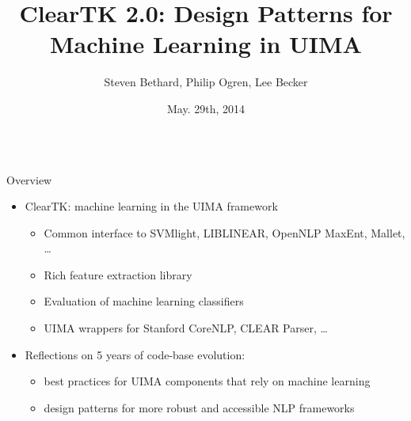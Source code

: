 \documentclass[final]{beamer}
\title{\Huge ClearTK 2.0: Design Patterns for Machine Learning in UIMA\\[0.2ex]}
\author{Steven Bethard\inst{1}, Philip Ogren\inst{2}, Lee Becker\inst{2}}
\institute[] %
{
  \inst{1}%
  University of Alabama at Birmingham, Birmingham, AL, USA
  \\
  \inst{2}%
  University of Colorado Boulder, Boulder, CO, USA
}
\date[May. 29th, 2014]{May. 29th, 2014}
\begin{document}
\begin{frame}[fragile]

\vspace{-1cm}
\begin{columns}[t]
  \begin{column}{.45\linewidth}
    \begin{block}{Overview}
      \begin{itemize}
      \item ClearTK: machine learning in the UIMA framework

        \begin{itemize}
        \item Common interface to SVMlight, LIBLINEAR, OpenNLP MaxEnt, Mallet, \ldots
        \item Rich feature extraction library
        \item Evaluation of machine learning classifiers
        \item UIMA wrappers for Stanford CoreNLP, CLEAR Parser, \ldots
        \end{itemize}

      \bigskip
      \item Reflections on 5 years of code-base evolution:
        \begin{itemize}
        \item best practices for UIMA components that rely on machine learning 
        \item design patterns for more robust and accessible NLP frameworks
        \end{itemize}
      \end{itemize}
    \end{block}
    


\end{column}
\end{columns}
\end{frame}
\end{document}
